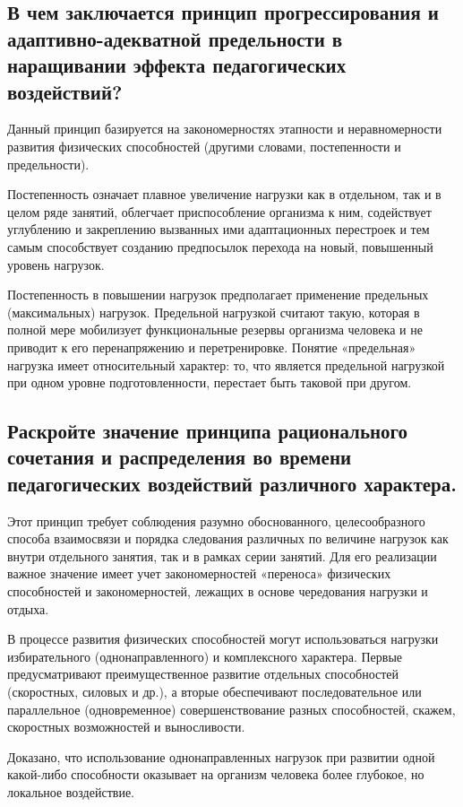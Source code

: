 \subsection{В чем заключается принцип прогрессирования и адаптивно-адекватной предельности в наращивании эффекта педагогических воздействий?}

Данный принцип базируется на закономерностях этапности и неравномерности развития физических способностей
(другими словами, постепенности и предельности).

Постепенность означает плавное увеличение нагрузки как в отдельном, так и в целом ряде занятий,
облегчает приспособление организма к ним, содействует углублению и закреплению вызванных ими адаптационных перестроек и
тем самым способствует созданию предпосылок перехода на новый, повышенный уровень нагрузок.

Постепенность в повышении нагрузок предполагает применение предельных (максимальных) нагрузок.
Предельной нагрузкой считают такую, которая в полной мере мобилизует функциональные резервы организма человека и
не приводит к его перенапряжению и перетренировке. Понятие «предельная» нагрузка имеет относительный характер:
то, что является предельной нагрузкой при одном уровне подготовленности, перестает быть таковой при другом.


\subsection{Раскройте значение принципа рационального сочетания и распределения во времени педагогических воздействий
    различного характера.}

Этот принцип требует соблюдения разумно обоснованного, целесообразного способа взаимосвязи и порядка следования различных
по величине нагрузок как внутри отдельного занятия, так и в рамках серии занятий. Для его реализации важное значение имеет
учет закономерностей «переноса» физических способностей и закономерностей, лежащих в основе чередования нагрузки и отдыха.

В процессе развития физических способностей могут использоваться нагрузки избирательного (однонаправленного) и
комплексного характера. Первые предусматривают преимущественное развитие отдельных способностей (скоростных, силовых и др.),
а вторые обеспечивают последовательное или параллельное (одновременное) совершенствование разных способностей, скажем,
скоростных возможностей и выносливости.

Доказано, что использование однонаправленных нагрузок при развитии одной какой-либо способности оказывает на организм человека
более глубокое, но локальное воздействие.

